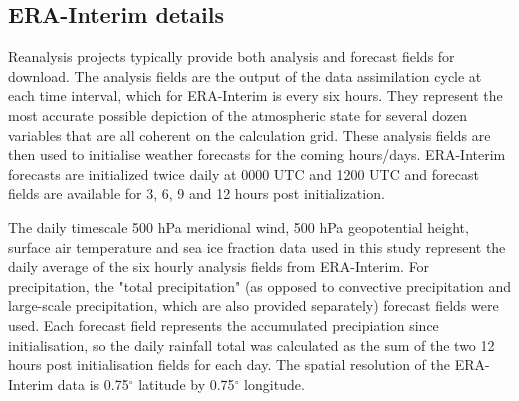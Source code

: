 \subsection{ERA-Interim details}

Reanalysis projects typically provide both analysis and forecast fields for download. The analysis fields are the output of the data assimilation cycle at each time interval, which for ERA-Interim is every six hours. They represent the most accurate possible depiction of the atmospheric state for several dozen variables that are all coherent on the calculation grid. These analysis fields are then used to initialise weather forecasts for the coming hours/days. ERA-Interim forecasts are initialized twice daily at 0000 UTC and 1200 UTC and forecast fields are available for 3, 6, 9 and 12 hours post initialization.  

The daily timescale 500 hPa meridional wind, 500 hPa geopotential height, surface air temperature and sea ice fraction data used in this study represent the daily average of the six hourly analysis fields from ERA-Interim. For precipitation, the "total precipitation" (as opposed to convective precipitation and large-scale precipitation, which are also provided separately) forecast fields were used. Each forecast field represents the accumulated precipiation since initialisation, so the daily rainfall total was calculated as the sum of the two 12 hours post initialisation fields for each day. The spatial resolution of the ERA-Interim data is 0.75$^{\circ}$ latitude by 0.75$^{\circ}$ longitude.   